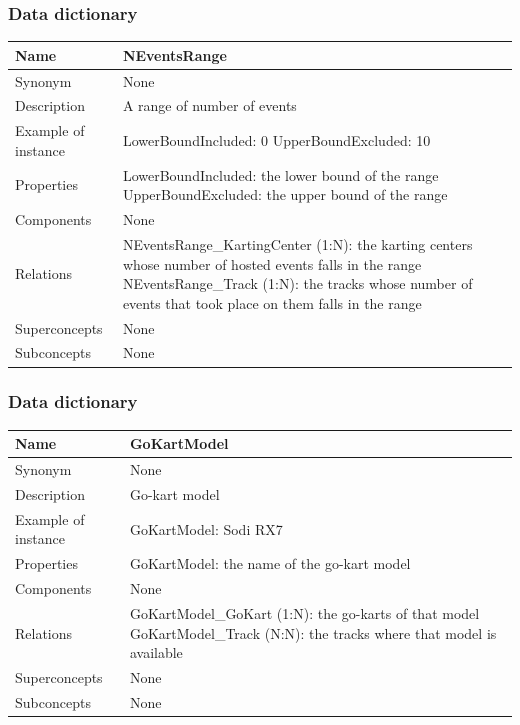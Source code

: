 \documentclass{beamer}
\begin{document}
\begin{frame}
    \frametitle{Data dictionary}
    \begin{table}
    \tiny
    \begin{tabular}{|p{2cm}|p{6cm}|}
    \hline
    Name & \textbf{NEventsRange} \\
    \hline
    Synonym & None \\
    \hline
    Description & A range of number of events \\
    \hline
    Example of instance &
    LowerBoundIncluded: 0 \newline
    UpperBoundExcluded: 10 \\
    \hline
    Properties &
    LowerBoundIncluded: the lower bound of the range \newline
    UpperBoundExcluded: the upper bound of the range \\
    \hline
    Components & None \\
    \hline
    Relations &
    NEventsRange\_KartingCenter (1:N): the karting centers whose number of hosted events falls in the range \newline
    NEventsRange\_Track (1:N): the tracks whose number of events that took place on them falls in the range \\
    \hline
    Superconcepts & None \\
    \hline
    Subconcepts & None \\
    \hline
    \end{tabular}
    \end{table}
\end{frame}

\begin{frame}
    \frametitle{Data dictionary}
    \begin{table}
    \tiny
    \begin{tabular}{|p{2cm}|p{6cm}|}
    \hline
    Name & \textbf{GoKartModel} \\
    \hline
    Synonym & None \\
    \hline
    Description & Go-kart model \\
    \hline
    Example of instance &
    GoKartModel: Sodi RX7 \\
    \hline
    Properties &
    GoKartModel: the name of the go-kart model \\
    \hline
    Components & None \\
    \hline
    Relations &
    GoKartModel\_GoKart (1:N): the go-karts of that model \newline
    GoKartModel\_Track (N:N): the tracks where that model is available\\
    \hline
    Superconcepts & None \\
    \hline
    Subconcepts & None \\
    \hline
    \end{tabular}
    \end{table}
\end{frame}
\end{document}
